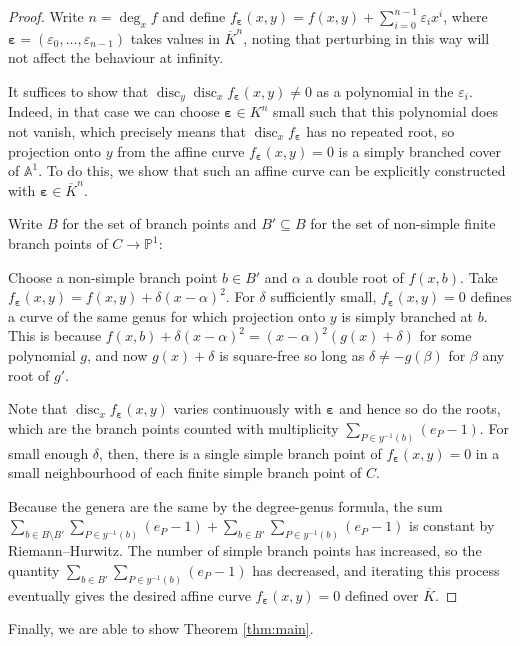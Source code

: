 \documentclass[12pt]{amsart}
\theoremstyle{definition}
\theoremstyle{remark}
\newcommand{\eps}{\varepsilon}
\newcommand{\Proj}{\mathbb{P}}
\DeclareMathOperator{\disc}{disc}
\renewcommand{\bar}{\overline}
\begin{document}
\begin{proof}
    Write $n=\deg_x f$ and define ${f}_{\pmb{\eps}}(x,y)=f(x,y)+\sum_{i=0}^{n-1}\eps_i x^i$, where $\pmb{\eps}=(\eps_0,\hdots,\eps_{n-1})$ takes values in $\bar{K}^n$, noting that perturbing in this way will not affect the behaviour at infinity. 
    
    It suffices to show that $\disc_y\disc_xf_{\pmb{\eps}}(x,y)\ne0$ as a polynomial in the $\eps_i$. Indeed, in that case we can choose $\pmb{\eps}\in K^n$ small such that this polynomial does not vanish, which precisely means that $\disc_xf_{\pmb{\eps}}$ has no repeated root, so projection onto $y$ from the affine curve $f_{\pmb{\eps}}(x,y)=0$ is a simply branched cover of $\mathbb{A}^1$. To do this, we show that such an affine curve can be explicitly constructed with $\pmb{\eps}\in \bar{K}^n$. 
    
    Write $B$ for the set of branch points and $B'\subseteq B$ for the set of non-simple finite branch points of $C\to\Proj^1$:
        
    Choose a non-simple branch point $b\in B'$ and $\alpha$ a double root of $f(x,b)$. Take $f_{\pmb{\eps}}(x,y)=f(x,y)+\delta(x-\alpha)^2$. For $\delta$ sufficiently small, $f_{\pmb{\eps}}(x,y)=0$ defines a curve of the same genus for which projection onto $y$ is simply branched at $b$. This is because $f(x,b)+\delta(x-\alpha)^2=(x-\alpha)^2(g(x)+\delta)$ for some polynomial $g$, and now $g(x)+\delta$ is square-free so long as $\delta \ne -g(\beta)$ for $\beta$ any root of $g'$.

    Note that $\disc_x f_{\pmb{\eps}}(x,y)$ varies continuously with $\pmb{\eps}$ and hence so do the roots, which are the branch points counted with multiplicity $\sum_{P\in y^{-1}(b)}(e_P-1)$. For small enough $\delta$, then, there is a single simple branch point of $f_{\pmb{\eps}}(x,y)=0$ in a small neighbourhood of each finite simple branch point of $C$.
    
    Because the genera are the same by the degree-genus formula, the sum $\sum_{b\in B\setminus B'}\sum_{P\in y^{-1}(b)}(e_P-1)+\sum_{b\in B'}\sum_{P\in y^{-1}(b)}(e_P-1)$ is constant by Riemann--Hurwitz. The number of simple branch points has increased, so the quantity $\sum_{b\in B'}\sum_{P\in y^{-1}(b)}(e_P-1)$ has decreased, and iterating this process eventually gives the desired affine curve $f_{\pmb{\eps}}(x,y)=0$ defined over $\bar{K}$.
\end{proof}

Finally, we are able to show Theorem \ref{thm:main}.
\end{document}
